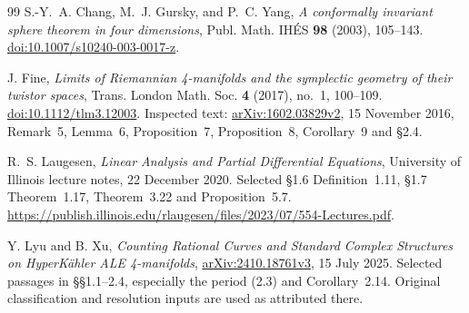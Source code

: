 \documentclass[11pt]{article}
\numberwithin{equation}{section}
\theoremstyle{definition}
\theoremstyle{remark}
\begin{document}
\begin{thebibliography}{99}
S.-Y.~A. Chang, M.~J. Gursky, and P.~C. Yang,
\emph{A conformally invariant sphere theorem in four dimensions},
Publ. Math. IH\'ES \textbf{98} (2003), 105--143.
\href{https://doi.org/10.1007/s10240-003-0017-z}{doi:10.1007/s10240-003-0017-z}.

J. Fine,
\emph{Limits of Riemannian 4-manifolds and the symplectic geometry
of their twistor spaces},
Trans. London Math. Soc. \textbf{4} (2017), no.~1, 100--109.
\href{https://doi.org/10.1112/tlm3.12003}{doi:10.1112/tlm3.12003}.
Inspected text: \href{https://arxiv.org/abs/1602.03829v2}{arXiv:1602.03829v2},
15 November 2016, Remark~5, Lemma~6, Proposition~7,
Proposition~8, Corollary~9 and \S2.4.

R.~S. Laugesen,
\emph{Linear Analysis and Partial Differential Equations},
University of Illinois lecture notes, 22 December 2020.
Selected \S1.6 Definition~1.11, \S1.7 Theorem~1.17,
Theorem~3.22 and Proposition~5.7.
\url{https://publish.illinois.edu/rlaugesen/files/2023/07/554-Lectures.pdf}.

Y. Lyu and B. Xu,
\emph{Counting Rational Curves and Standard Complex Structures
on HyperK\"ahler ALE 4-manifolds},
\href{https://arxiv.org/abs/2410.18761v3}{arXiv:2410.18761v3},
15 July 2025.
Selected passages in \S\S1.1--2.4, especially the period (2.3) and
Corollary~2.14. Original classification and resolution
inputs are used as attributed there.

\end{thebibliography}
\end{document}
